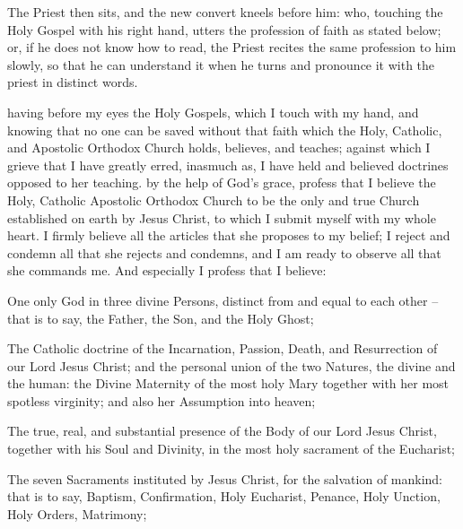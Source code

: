 
\begin{rubric}
    The Priest then sits, and the new convert kneels before him: who, touching the Holy Gospel with his right hand, utters the profession of faith as stated below; or, if he does not know how to read, the Priest recites the same profession to him slowly, so that he can understand it when he turns and pronounce it with the priest in distinct words.
\end{rubric}
 having before my eyes the Holy Gospels, which I touch with my hand, and knowing that no one can be saved without that faith which the Holy, Catholic, and Apostolic 
Orthodox Church holds, believes, and teaches; against which I grieve that I have greatly erred, inasmuch as, I have held and believed doctrines opposed to her teaching.
 by the help of God’s grace, profess that I believe the Holy, Catholic Apostolic 
Orthodox Church to be the only and true Church established on earth by Jesus Christ, to which I submit myself with my whole heart. I firmly believe all the articles that she proposes to my belief; I reject and condemn all that she rejects and condemns, and I am ready to observe all that she commands me. And especially I profess that I believe:

One only God in three divine Persons, distinct from and equal to each other -- that is to say, the Father, the Son, and the Holy Ghost;

The Catholic doctrine of the Incarnation, Passion, Death, and Resurrection of our Lord Jesus Christ; and the personal union of the two Natures, the divine and the human: the Divine Maternity of the most holy Mary together with her most spotless virginity; and also her 
Assumption into heaven;

The true, real, and substantial presence of the Body of our Lord Jesus Christ, together with his Soul and Divinity, in the most holy sacrament of the Eucharist;

The seven Sacraments instituted by Jesus Christ, for the salvation of mankind: that is to say, Baptism, Confirmation, Holy Eucharist, Penance, 
Holy Unction, Holy Orders, Matrimony;

